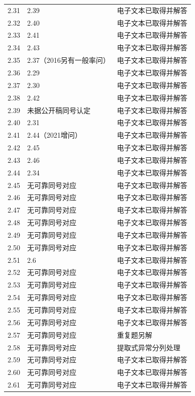 \documentclass[
  11pt,
  a4paper,
  UTF8,fontset=fandol]{ctexart}
\begin{document}
\begin{longtable}[]{@{}lll@{}}
2.31 & 2.39 & 电子文本已取得并解答 \\
2.32 & 2.40 & 电子文本已取得并解答 \\
2.33 & 2.41 & 电子文本已取得并解答 \\
2.34 & 2.43 & 电子文本已取得并解答 \\
2.35 & 2.37（2016另有一般率问） & 电子文本已取得并解答 \\
2.36 & 2.29 & 电子文本已取得并解答 \\
2.37 & 2.30 & 电子文本已取得并解答 \\
2.38 & 2.42 & 电子文本已取得并解答 \\
2.39 & 未据公开稿同号认定 & 电子文本已取得并解答 \\
2.40 & 2.31 & 电子文本已取得并解答 \\
2.41 & 2.44（2021增问） & 电子文本已取得并解答 \\
2.42 & 2.45 & 电子文本已取得并解答 \\
2.43 & 2.46 & 电子文本已取得并解答 \\
2.44 & 2.34 & 电子文本已取得并解答 \\
2.45 & 无可靠同号对应 & 电子文本已取得并解答 \\
2.46 & 无可靠同号对应 & 电子文本已取得并解答 \\
2.47 & 无可靠同号对应 & 电子文本已取得并解答 \\
2.48 & 无可靠同号对应 & 电子文本已取得并解答 \\
2.49 & 无可靠同号对应 & 电子文本已取得并解答 \\
2.50 & 无可靠同号对应 & 电子文本已取得并解答 \\
2.51 & 2.6 & 电子文本已取得并解答 \\
2.52 & 无可靠同号对应 & 电子文本已取得并解答 \\
2.53 & 无可靠同号对应 & 电子文本已取得并解答 \\
2.54 & 无可靠同号对应 & 电子文本已取得并解答 \\
2.55 & 无可靠同号对应 & 电子文本已取得并解答 \\
2.56 & 无可靠同号对应 & 电子文本已取得并解答 \\
2.57 & 无可靠同号对应 & 重复题另解 \\
2.58 & 无可靠同号对应 & 提取式异常分列处理 \\
2.59 & 无可靠同号对应 & 电子文本已取得并解答 \\
2.60 & 无可靠同号对应 & 电子文本已取得并解答 \\
2.61 & 无可靠同号对应 & 电子文本已取得并解答 \\
\end{longtable}
\end{document}
